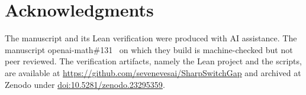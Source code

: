 \section*{Acknowledgments}
The manuscript and its Lean verification were produced with AI assistance.
The manuscript openai-math\#131~\cite{OAI26} on which they build is
machine-checked but not peer reviewed. The verification artifacts, namely the Lean project and the scripts, are
available at \url{https://github.com/sevenevesai/SharpSwitchGap} and archived at
Zenodo under \href{https://doi.org/10.5281/zenodo.23295359}{doi:10.5281/zenodo.23295359}.
